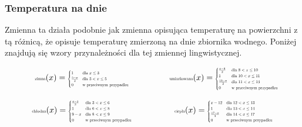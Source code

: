 \documentclass{article}
\begin{document}
\subsubsection{Temperatura na dnie}

\noindent Zmienna ta działa podobnie jak zmienna opisująca temperaturę na powierzchni z tą różnicą, że opisuje temperaturę zmierzoną na dnie zbiornika wodnego. Poniżej znajdują się wzory przynależności dla tej zmiennej lingwistycznej.

\begin{equation*}
\begin{minipage}{0.5\textwidth}
\centering
$\text{\scalebox{0.5}{zimna}}(x) = 
\scalebox{0.5}{$
\begin{cases} 
1 & \text{dla } x \leq 3 \\
\frac{5 - x}{2} & \text{dla } 3 < x \leq 5 \\
0 & \text{w przeciwnym przypadku}
\end{cases}
$}$
\end{minipage}%
\begin{minipage}{0.5\textwidth}
\centering
$\text{\scalebox{0.5}{umiarkowana}}(x) = 
\scalebox{0.5}{$
\begin{cases} 
\frac{x - 8}{2} & \text{dla } 8 < x \leq 10 \\
1 & \text{dla } 10 < x \leq 11 \\
\frac{13 - x}{2} & \text{dla } 11 < x \leq 13 \\
0 & \text{w przeciwnym przypadku}
\end{cases}
$}$
\end{minipage}
\end{equation*}

\begin{equation*}
\begin{minipage}{0.5\textwidth}
\centering
$\text{\scalebox{0.5}{chłodna}}(x) = 
\scalebox{0.5}{$
\begin{cases} 
\frac{x - 3}{3} & \text{dla } 3 < x \leq 6 \\
1 & \text{dla } 6 < x \leq 8 \\
9 - x & \text{dla } 8 < x \leq 9 \\
0 & \text{w przeciwnym przypadku}
\end{cases}
$}$
\end{minipage}%
\begin{minipage}{0.5\textwidth}
\centering
$\text{\scalebox{0.5}{ciepła}}(x) = 
\scalebox{0.5}{$
\begin{cases} 
x - 12 & \text{dla } 12 < x \leq 13 \\
1 & \text{dla } 13 < x \leq 14 \\
\frac{17 - x}{3} & \text{dla } 14 < x \leq 17 \\
0 & \text{w przeciwnym przypadku}
\end{cases}
$}$
\end{minipage}
\end{equation*}
\end{document}
